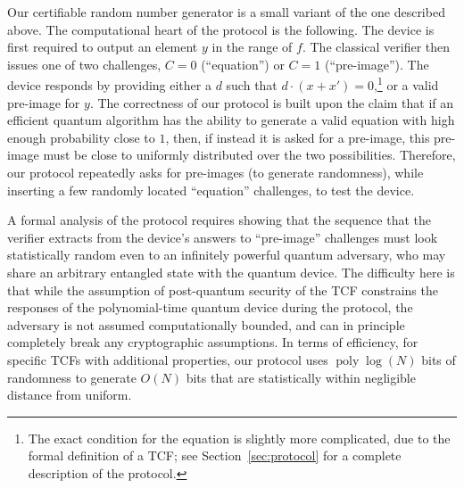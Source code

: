 \documentclass[11pt]{article}
\theoremstyle{remark}
\theoremstyle{definition}
\DeclareMathOperator{\poly}{poly}
\begin{document}
Our certifiable random number generator is a small variant of the one described above. 
The computational heart of the protocol is the following. The device is first required to output an element $y$ in the range of $f$. The classical verifier then issues one of 
two challenges,  $C=0$ (``equation'') or $C=1$ (``pre-image''). The device responds by providing either a $d$ such that $d\cdot(x + x') = 0$,\footnote{The exact condition for the equation is slightly more complicated, due to the formal definition of a TCF; see Section~\ref{sec:protocol} for a complete description of the protocol.} or a valid pre-image for $y$. 
The correctness of our protocol is built upon the claim that if an efficient quantum algorithm has the ability to generate a valid equation with high enough probability close to $1$, then, if instead it is asked for a pre-image, this pre-image must be close to uniformly distributed over the two possibilities. Therefore, our protocol repeatedly asks for pre-images (to generate randomness), while inserting a few randomly located ``equation'' challenges, to test the device. 

A formal analysis of the protocol requires showing that the sequence
that the verifier extracts from the device's answers to ``pre-image'' challenges must look statistically random even to an 
infinitely powerful quantum adversary, who may share an arbitrary entangled state with
the quantum device. The difficulty here is that while the assumption of post-quantum security of the TCF constrains the responses of the polynomial-time quantum device during the
protocol, the adversary is not assumed computationally bounded, and can in principle completely break any cryptographic assumptions. In terms of efficiency, 
for specific TCFs with additional properties, our protocol uses $\poly\log(N)$ bits of randomness to 
generate $O(N)$ bits that are statistically within negligible distance from uniform. 
\end{document}
